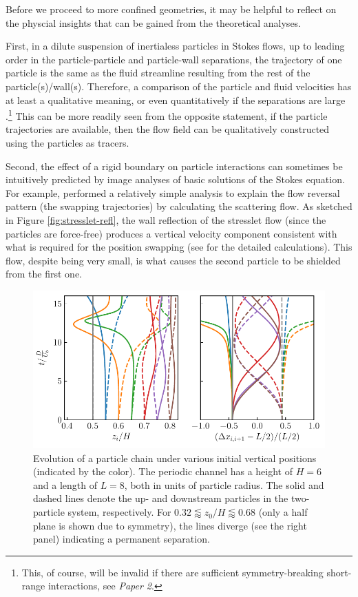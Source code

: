 \bigskip
Before we proceed to more confined geometries, it may be helpful to reflect on the physcial insights that can be gained from the theoretical analyses.

First, in a dilute suspension of inertialess particles in Stokes flows, up to leading order in the particle-particle and particle-wall separations, the trajectory of one particle is the same as the fluid streamline resulting from the rest of the particle(s)/wall(s). Therefore, a comparison of the particle and fluid velocities has at least a qualitative meaning, or even quantitatively if the separations are large \citep{zurita-gotor_2007}.\footnote{This, of course, will be invalid if there are sufficient symmetry-breaking short-range interactions, see \eg \emph{Paper 2}.}
This can be more readily seen from the opposite statement, \viz if the particle trajectories are available, then the flow field can be qualitatively constructed using the particles as tracers.

Second, the effect of a rigid boundary on particle interactions can sometimes be intuitively predicted by image analyses of basic solutions of the Stokes equation.
For example, \cite{zurita-gotor_2007} performed a relatively simple analysis to explain the flow reversal pattern (\ie the swapping trajectories) by calculating the scattering flow.
As sketched in Figure \ref{fig:stresslet-refl}, the wall reflection of the stresslet flow (since the particles are force-free) produces a vertical velocity component consistent with what is required for the position swapping (see \cite{zurita-gotor_2007} for the detailed calculations). This flow, despite being very small, is what causes the second particle to be shielded from the first one.

\begin{figure}%
  \centering
  \includegraphics[width=0.9\columnwidth]{H3.pdf}
  \caption{Evolution of a particle chain under various initial vertical positions (indicated by the color). The periodic channel has a height of $H=6$ and a length of $L=8$, both in units of particle radius. The solid and dashed lines denote the up- and downstream particles in the two-particle system, respectively. For $0.32 \lessapprox z_0/H \lessapprox 0.68$ (only a half plane is shown due to symmetry), the lines diverge (see the right panel) indicating a permanent separation.}
  \label{fig:xover}
\end{figure}

